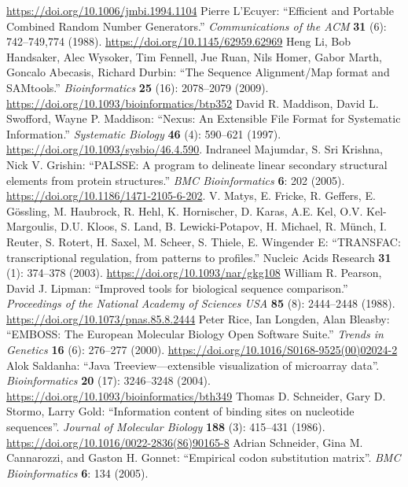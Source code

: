 \documentclass{report}
\begin{document}
\begin{thebibliography}{99}
\url{https://doi.org/10.1006/jmbi.1994.1104}
Pierre L'Ecuyer: ``Efficient and Portable Combined Random Number Generators.''
\textit{Communications of the ACM} {\bf 31} (6): 742--749,774 (1988).
\url{https://doi.org/10.1145/62959.62969}
Heng Li, Bob Handsaker, Alec Wysoker, Tim Fennell, Jue Ruan, Nils Homer, Gabor Marth, Goncalo Abecasis, Richard Durbin: ``The Sequence Alignment/Map format and SAMtools.'' \textit{Bioinformatics} {\bf 25} (16): 2078--2079 (2009).
\url{https://doi.org/10.1093/bioinformatics/btp352}
David R. Maddison, David L. Swofford, Wayne P. Maddison: ``Nexus: An Extensible File Format for Systematic Information.'' \textit{Systematic Biology} {\bf 46} (4): 590--621 (1997).
\url{https://doi.org/10.1093/sysbio/46.4.590}.
Indraneel Majumdar, S. Sri Krishna, Nick V. Grishin: ``PALSSE: A program to delineate linear secondary structural elements from protein structures.'' \textit{BMC Bioinformatics} {\bf 6}: 202 (2005).
\url{https://doi.org/10.1186/1471-2105-6-202}.
V. Matys, E. Fricke, R. Geffers, E. G\"ossling, M. Haubrock, R. Hehl, K. Hornischer, D. Karas, A.E. Kel, O.V. Kel-Margoulis, D.U. Kloos, S. Land, B. Lewicki-Potapov, H. Michael, R. M\"unch, I. Reuter, S. Rotert, H. Saxel, M. Scheer, S. Thiele, E. Wingender E: ``TRANSFAC: transcriptional regulation, from patterns to profiles.'' Nucleic Acids Research {\bf 31} (1): 374--378 (2003).
\url{https://doi.org/10.1093/nar/gkg108}
William R. Pearson, David J. Lipman: ``Improved tools for biological sequence comparison.'' \textit{Proceedings of the National Academy of Sciences USA} {\bf 85} (8): 2444--2448 (1988).
\url{https://doi.org/10.1073/pnas.85.8.2444}
Peter Rice, Ian Longden, Alan Bleasby: ``EMBOSS: The European Molecular Biology Open Software Suite.'' \textit{Trends in Genetics} {\bf 16} (6): 276--277 (2000).
\url{https://doi.org/10.1016/S0168-9525(00)02024-2}
Alok Saldanha: ``Java Treeview---extensible visualization of microarray data''. \textit{Bioinformatics} {\bf 20} (17): 3246--3248 (2004).
\url{https://doi.org/10.1093/bioinformatics/bth349}
Thomas D. Schneider, Gary D. Stormo, Larry Gold: ``Information content of binding sites on nucleotide sequences''. \textit{Journal of Molecular Biology} {\bf 188} (3): 415--431 (1986). \url{https://doi.org/10.1016/0022-2836(86)90165-8}
Adrian Schneider, Gina M. Cannarozzi, and Gaston H. Gonnet: ``Empirical codon substitution matrix''. \textit{BMC Bioinformatics} {\bf 6}: 134 (2005).

\end{thebibliography}
\end{document}
